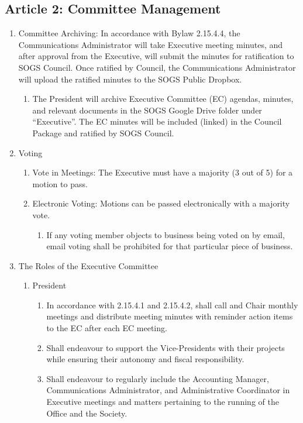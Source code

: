 \subsection{Article 2: Committee Management}
\begin{enumerate}[label*=\arabic*., align=left]
\item Committee Archiving: In accordance with Bylaw 2.15.4.4, the Communications Administrator will take Executive meeting minutes, and after approval from the
Executive, will submit the minutes for ratification to SOGS Council. Once ratified by Council, the Communications Administrator will upload the ratified minutes to the SOGS
Public Dropbox.
\begin{enumerate}[label*=\arabic*., align=left]
\item The President will archive Executive Committee (EC) agendas, minutes, and relevant documents in the SOGS Google Drive folder under “Executive”. The EC minutes will be included (linked) in the Council Package and ratified by SOGS Council.
\end{enumerate}
\item Voting
\begin{enumerate}[label*=\arabic*., align=left]
\item Vote in Meetings: The Executive must have a majority (3 out of 5) for a motion to pass.
\item Electronic Voting: Motions can be passed electronically with a majority vote.
\begin{enumerate}[label*=\arabic*., align=left]
\item If any voting member objects to business being voted on by email, email voting shall be prohibited for that particular piece of business.
\end{enumerate}
\end{enumerate}
\item The Roles of the Executive Committee
\begin{enumerate}[label*=\arabic*., align=left]
\item President
\begin{enumerate}[label*=\arabic*., align=left]
\item In accordance with 2.15.4.1 and 2.15.4.2, shall call and Chair monthly meetings and distribute meeting minutes with reminder action items to the EC after each EC meeting.
\item Shall endeavour to support the Vice-Presidents with their projects while ensuring their autonomy and fiscal responsibility.
\item Shall endeavour to regularly include the Accounting Manager, Communications Administrator, and Administrative Coordinator in Executive meetings and matters pertaining to the running of the Office and the Society.

\end{enumerate}
\end{enumerate}
\end{enumerate}
